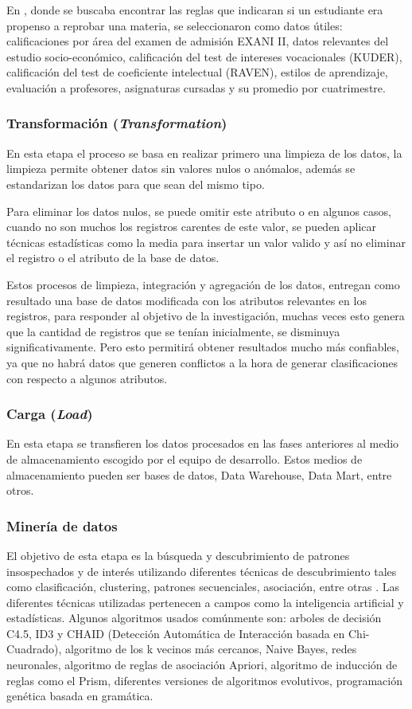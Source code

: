 En \cite{key-140}, donde se buscaba encontrar las reglas que indicaran si un estudiante era propenso a reprobar una materia, se seleccionaron como datos útiles: calificaciones por área del examen de admisión EXANI II, datos relevantes del estudio socio-económico, calificación del test de intereses vocacionales (KUDER), calificación del test de coeficiente intelectual (RAVEN), estilos de aprendizaje, evaluación a profesores, asignaturas cursadas y su promedio por cuatrimestre.
\subsubsection{Transformación (\emph{Transformation}) \cite{key-50,key-100}}
En esta etapa el proceso se basa en realizar primero una limpieza de los datos, la limpieza permite obtener datos sin valores nulos o anómalos, además se estandarizan los datos para que sean del mismo tipo. 

Para eliminar los datos nulos, se puede omitir este atributo o en algunos casos, cuando no son muchos los registros carentes de este valor, se pueden aplicar técnicas estadísticas como la media para insertar un valor valido y así no eliminar el registro o el atributo de la base de datos.

Estos procesos de limpieza, integración y agregación de los datos, entregan como resultado una base de datos modificada con los atributos relevantes en los registros, para responder al objetivo de la investigación, muchas veces esto genera que la cantidad de registros que se tenían inicialmente, se disminuya significativamente. Pero esto permitirá obtener resultados mucho más confiables, ya que no habrá datos que generen conflictos a la hora de generar clasificaciones con respecto a algunos atributos.
\subsubsection{Carga (\emph{Load}) \cite{key-50,key-100}}
En esta etapa se transfieren los datos procesados en las fases anteriores al medio de almacenamiento escogido por el equipo de desarrollo. Estos medios de almacenamiento pueden ser bases de datos, Data Warehouse, Data Mart, entre otros.
\subsubsection{Minería de datos \cite{key-50,key-100}}
El objetivo de esta etapa es la búsqueda y descubrimiento de patrones insospechados y de interés utilizando diferentes técnicas de descubrimiento tales como clasificación, clustering, patrones secuenciales, asociación, entre otras \cite{key-100}. Las diferentes técnicas utilizadas pertenecen a campos como la inteligencia artificial y estadísticas. Algunos algoritmos usados comúnmente son: arboles de decisión C4.5, ID3 \cite{key-160} y CHAID (Detección Automática de Interacción basada en Chi-Cuadrado), algoritmo de los k vecinos más cercanos, Naive Bayes, redes neuronales, algoritmo de reglas de asociación Apriori, algoritmo de inducción de reglas como el Prism, diferentes versiones de algoritmos evolutivos, programación genética basada en gramática.
